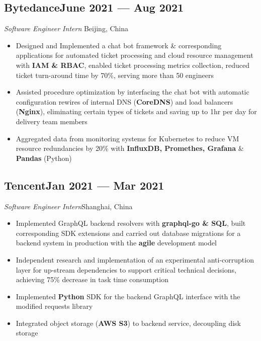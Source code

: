 \documentclass[a4,12pt]{article}
\newcommand{\subtext}[1]{
#1\par\vspace{-0.3cm}}
\newenvironment{zitemize}{
\begin{itemize}\itemsep0pt \parskip0pt \parsep1pt}
{\end{itemize}\vspace{-0.5cm}}
\begin{document}
\subsection*{\normalsize\textbf{Bytedance}\hfill June 2021 --- Aug 2021} 
\subtext{\textit{Software Engineer Intern} \hfill Beijing, China} 
    \begin{zitemize}
        \item Designed and Implemented a chat bot framework \& corresponding applications for automated ticket processing and cloud resource management with \textbf{IAM \& RBAC}, enabled ticket processing metrics collection, reduced ticket turn-around time by 70\%, serving more than 50 engineers
        \item Assisted procedure optimization by interfacing the chat bot with automatic configuration rewires of internal DNS (\textbf{CoreDNS}) and load balancers (\textbf{Nginx}), eliminating certain types of tickets and saving up to 1hr per day for delivery team members
        \item Aggregated data from monitoring systems for Kubernetes to reduce VM resource redundancies by 20\% with \textbf{InfluxDB, Promethes, Grafana} \& \textbf{Pandas} (Python)
    \end{zitemize}
\vspace{-0.1cm}

\subsection*{\normalsize\textbf{Tencent}\hfill Jan 2021 --- Mar 2021} 
\subtext{\textit{Software Engineer Intern}\hfill Shanghai, China} 
    \begin{zitemize}
        \item Implemented GraphQL backend resolvers with \textbf{graphql-go \& SQL}, built corresponding SDK extensions and carried out database migrations for a backend system in production with the \textbf{agile} development model
        \item Independent research and implementation of an experimental anti-corruption layer for up-stream dependencies to support critical technical decisions, achieving 75\% decrease in task time consumption
        \item Implemented \textbf{Python} SDK for the backend GraphQL interface with the modified requests library
        \item Integrated object storage (\textbf{AWS S3}) to backend service, decoupling disk storage
    \end{zitemize}
\end{document}
